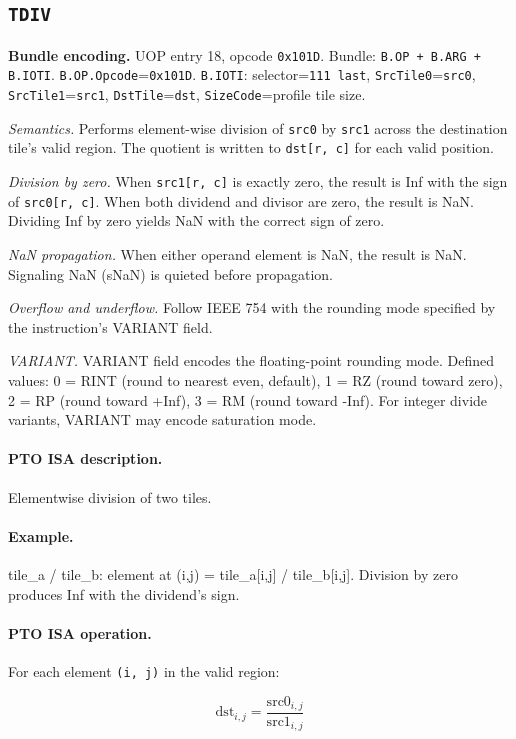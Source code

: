 \subsection{\texttt{TDIV}}
\noindent\textbf{Bundle encoding.} UOP entry 18, opcode \texttt{0x101D}. Bundle: \texttt{B.OP + B.ARG + B.IOTI}. \texttt{B.OP.Opcode}=\texttt{0x101D}. \texttt{B.IOTI}: selector=\texttt{111 last}, \texttt{SrcTile0}=\texttt{src0}, \texttt{SrcTile1}=\texttt{src1}, \texttt{DstTile}=\texttt{dst}, \texttt{SizeCode}=profile tile size.\par\smallskip

\textit{Semantics.} Performs element-wise division of \texttt{src0} by \texttt{src1} across the destination tile's valid region. The quotient is written to \texttt{dst[r, c]} for each valid position.

\textit{Division by zero.} When \texttt{src1[r, c]} is exactly zero, the result is Inf with the sign of \texttt{src0[r, c]}. When both dividend and divisor are zero, the result is NaN. Dividing Inf by zero yields NaN with the correct sign of zero.

\textit{NaN propagation.} When either operand element is NaN, the result is NaN. Signaling NaN (sNaN) is quieted before propagation.

\textit{Overflow and underflow.} Follow IEEE 754 with the rounding mode specified by the instruction's VARIANT field.

\textit{VARIANT.} VARIANT field encodes the floating-point rounding mode. Defined values: 0 = RINT (round to nearest even, default), 1 = RZ (round toward zero), 2 = RP (round toward +Inf), 3 = RM (round toward -Inf). For integer divide variants, VARIANT may encode saturation mode.\par\smallskip
{\small
\paragraph{PTO ISA description.}
Elementwise division of two tiles.
\paragraph{Example.}
tile\_a / tile\_b: element at (i,j) = tile\_a[i,j] / tile\_b[i,j]. Division by zero produces Inf with the dividend's sign.
\par\smallskip
\paragraph{PTO ISA operation.}
For each element \texttt{(i, j)} in the valid region:

\[
\mathrm{dst}_{i,j} = \frac{\mathrm{src0}_{i,j}}{\mathrm{src1}_{i,j}}
\]
}\par\smallskip

